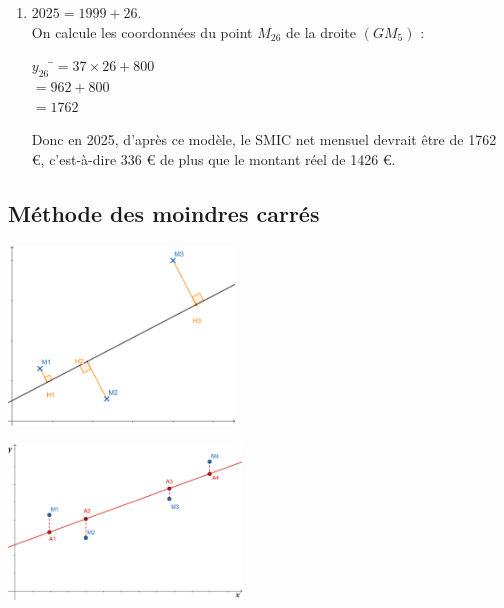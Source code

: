 \documentclass[a4paper,11pt,exos]{nsi} %
\begin{document}
{\begin{enumerate}
\begin{multicols}{2}
\begin{tabbing}
                \> $=37$
            \end{tabbing}
            \begin{tabbing}
                $y_G=m\ x_G+p\quad$\= $\iff \quad 929,5=37\times 3,5+p$\\
                \> $\iff \quad 929,5=129,5+p$\\
                \> $\iff \quad p=929,5-129,5$\\
                \> $\iff \quad p=800$
            \end{tabbing}
        \end{multicols}
        Donc l'équation de la droite $(GM_5)$ est $y=37x+800$.
        \item $2025=1999+26$.\\
        On calcule les coordonnées du point $M_{26}$ de la droite $(GM_5)$ :
        \begin{tabbing}
            $y_{26}$    \=$=37\times 26+800$\\
            \> $=962+800$\\
            \> $=1762$
        \end{tabbing}
        Donc en 2025, d'après ce modèle, le SMIC net mensuel devrait être de 1762 €, c'est-à-dire 336 € de plus que le montant réel de 1426 €.
    \end{enumerate}
}

\subsection*{Méthode des moindres carrés}

{\includegraphics[width=6cm]{Ex17Hyperbole.png}}

\textcolor{UGLiBlue}{
    {\includegraphics[width=6.2cm]{Moindre_carres.png}}
}
\end{document}
